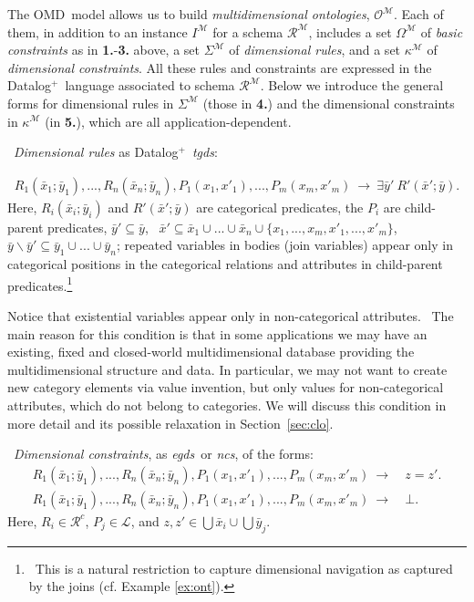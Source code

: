 \documentclass[format=acmsmall, review=false, screen=true]{acmart}
\newcommand{\mc}[1]{\mathcal{ #1}}
\newcommand{\schema}{\mc{R}}
\newcommand{\dplus}{{Datalog}$^+$}
\newcommand{\omd}{OMD}
\newcommand{\egds}{{\em egds}}
\newcommand{\tgds}{{\em tgds}}
\newcommand{\ncs}{{\em ncs}}
\newcommand{\red}[1]{{#1}}
\begin{document}
The \omd \ model allows us to build  {\em multidimensional ontologies}, $\mc{O}^\mc{M}$. Each of them, in addition to an instance  $I^\mc{M}$ for a schema $\mc{R}^\mc{M}$, includes a set $\Omega^\mc{M}$ of {\em basic constraints} as in {\bf 1.}-{\bf 3.} above, a  set $\Sigma^\mc{M}$ of {\em dimensional rules}, and a set $\kappa^\mc{M}$ of {\em dimensional constraints}. All these rules and constraints are expressed in the \dplus \ language associated to schema $\schema^\mc{M}$. Below we introduce the general forms for dimensional rules in $\Sigma^\mc{M}$ (those in {\bf 4.}) and the dimensional constraints in $\kappa^\mc{M}$ (in {\bf 5.}), which are all application-dependent.

\vspace{2mm}
 \ {\em Dimensional rules} as \dplus \ \tgds:

\vspace{-4mm}
\begin{align}
R_1(\bar{x}_1;\bar{y}_1),...,R_n(\bar{x}_n;\bar{y}_n),P_1(x_1,x'_1),...,P_m(x_m,x'_m) \ \rightarrow \ \exists \bar{y}' \ \red{R'}(\red{\bar{x}'};\bar{y}).\label{frm:dimensional-rule}
\end{align}
Here, $R_i(\bar{x}_i;\bar{y}_i)$ and $\red{R'}(\red{\bar{x}'};\bar{y})$ are categorical predicates, the $P_i$ are child-parent predicates, $\bar{y}' \subseteq \bar{y}$, \ $\red{\bar{x}'} \subseteq \bar{x}_1 \cup ... \cup \bar{x}_n \cup \{x_1,...,x_m, x'_1,...,x'_m\}$, \ $\bar{y} \! \smallsetminus \! \bar{y}' \subseteq \bar{y}_1 \cup ... \cup \bar{y}_n$; repeated variables in bodies (join variables) appear only in categorical positions in the categorical relations and attributes in child-parent predicates.\footnote{\ This is a natural restriction to capture dimensional navigation as captured by the joins (cf. Example \ref{ex:ont}).}

Notice that existential variables appear only in non-categorical attributes. \ \red{The main reason for this condition is that in some applications we may have an existing, fixed and closed-world multidimensional database providing the multidimensional structure and data. In particular, we may not want to create new category elements via value invention, but only values for non-categorical attributes, which do not belong to categories. We will discuss this condition in more detail and its possible relaxation in Section~\ref{sec:clo}.}



\vspace{2mm}
 \
{\em Dimensional constraints}, as \egds \ or \ncs, of the forms:
\begin{align}
R_1(\bar{x}_1;\bar{y}_1),...,R_n(\bar{x}_n;\bar{y}_n),P_1(x_1,x'_1),...,P_m(x_m,x'_m) ~\rightarrow~& z=z'.\label{frm:dimensional-egd} \\
R_1(\bar{x}_1;\bar{y}_1),...,R_n(\bar{x}_n;\bar{y}_n), P_1(x_1,x'_1),...,P_m(x_m,x'_m) ~\rightarrow~& \bot. \label{frm:dimensional-nc}
\end{align}
Here, $R_i \in \mc{R}^c$, $P_j \in \mc{L}$, and $z,z' \in \bigcup \bar{x}_i \cup \bigcup \bar{y}_j$. %
\end{document}

